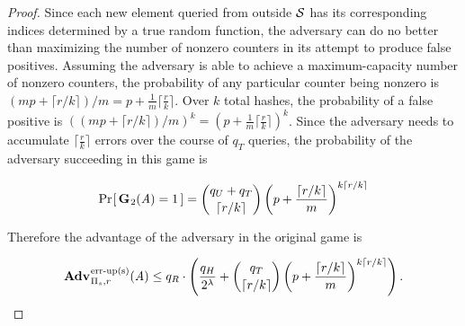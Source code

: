 \begin{proof}
Since each new element queried from outside $\mathcal{S}$ has its corresponding indices determined by a true random function, the adversary can do no better than maximizing the number of nonzero counters in its attempt to produce false positives. Assuming the adversary is able to achieve a maximum-capacity number of nonzero counters, the probability of any particular counter being nonzero is $(mp + \lceil r/k \rceil)/m = p + \frac{1}{m}\lceil\frac{r}{k}\rceil$. Over $k$ total hashes, the probability of a false positive is $\left((mp + \lceil r/k \rceil)/m\right)^k = \left(p + \frac{1}{m}\lceil\frac{r}{k}\rceil\right)^k$. Since the adversary needs to accumulate $\lceil\frac{r}{k}\rceil$ errors over the course of $q_T$ queries, the probability of the adversary succeeding in this game is

$$\Pr\hspace{-1pt}\left[\,\mathbf{G}\hspace{0.5pt}_2(\mathit{A}) = 1\,\right] = \binom{q_U + q_T}{\lceil r/k \rceil}\left(p+\frac{\lceil r/k \rceil}{m}\right)^{k\lceil r/k \rceil}$$

Therefore the advantage of the adversary in the original game is

$$\Adv{\erreps}_{\struct_s,r}(\advA) \le q_R \cdot \left(\frac{q_H}{2^\lambda} + \binom{q_T}{\lceil r/k \rceil}\left(p+\frac{\lceil r/k \rceil}{m}\right)^{k\lceil r/k \rceil}\right).$$\missingqed




\end{proof}